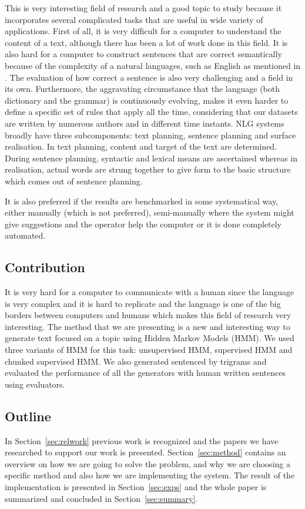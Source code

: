 \documentclass[a4paper,12pt]{article}
\begin{document}
This is very interesting field of research and a good topic to study because it
incorporates several complicated tasks that are useful in wide variety of
applications. First of all, it is very difficult for a computer to understand
the content of a text, although there has been a lot of work done in this field. 
It is also hard for a computer to construct sentences that are correct
semantically because of the complexity of a natural languages, such as English
as mentioned in \cite{nlgScratch}. The evaluation of how correct a sentence is 
also very challenging and a field in its own. Furthermore, the 
aggravating circumstance that the language (both dictionary and the grammar)
is continuously evolving, makes it even harder to define a specific set of rules 
that apply all the time, considering that our datasets are written by numerous
authors and in different time instants. NLG systems broadly have three
subcomponents: text planning, sentence planning and surface realisation.
In text planning, content and target of the text are determined. During sentence
planning, syntactic and lexical means are ascertained whereas in realisation, 
actual words are strung together to give form to the basic structure which comes out
of sentence planning. 

It is also preferred if the results are benchmarked in some systematical way,
either manually (which is not preferred), semi-manually where the system might
give suggestions and the operator help the computer or it is done completely
automated.


\subsection{Contribution}
It is very hard for a computer to communicate with a human since the language is
very complex and it is hard to replicate and the language is one of the big
borders between computers and humans which makes this field of research very
interesting. The method that we are presenting is a new and interesting way to
generate text focused on a topic using Hidden Markov Models (HMM). We used
three variants of HMM for this task: unsupervised HMM, supervised HMM and 
chunked supervised HMM. We also generated sentenced by trigrams and evaluated
the performance of all the generators with human written sentences using evaluators.

\subsection{Outline}
In Section~\ref{sec:relwork} previous work is recognized and the papers we have
researched to support our work is presented. Section~\ref{sec:method} contains
an overview on how we are going to solve the problem, and why we are choosing a
specific method and also how we are implementing the system. The result of the
implementation is presented in Section~\ref{sec:exps} and the whole paper is
summarized and concluded in Section~\ref{sec:summary}.
\end{document}
